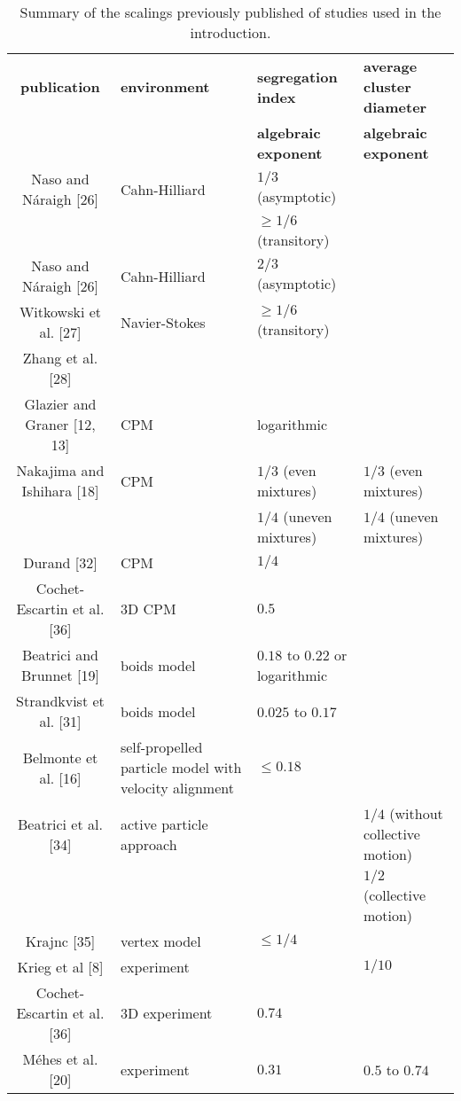 \documentclass[10pt,letterpaper]{article}
\begin{document}
\begin{table}

  \begin{tabular}[h]{c|m{3cm}|m{4cm}|m{5cm}}
  \textbf{publication} & \textbf{environment} & \textbf{segregation index} & \textbf{average cluster diameter} \\
   & & \textbf{algebraic exponent} & \textbf{algebraic exponent} \\
  \hline
    Naso and Náraigh [26] & Cahn-Hilliard & $1/3$ (asymptotic) \\
    & & $\geq 1/6$ (transitory) \\
  \hline
    Naso and Náraigh [26] & Cahn-Hilliard & $2/3$ (asymptotic) \\
    Witkowski et al. [27] & Navier-Stokes & $\geq 1/6$ (transitory) \\
    Zhang et al. [28] &  &  \\
  \hline
    Glazier and Graner [12, 13] & CPM &
    logarithmic & \\
  \hline
    Nakajima and Ishihara [18] & CPM & $1/3$ (even mixtures) & $1/3$ (even mixtures) \\
     & & $1/4$ (uneven mixtures) & $1/4$ (uneven mixtures) \\
 \hline
   Durand [32] & CPM & $1/4$ \\
 \hline
   Cochet-Escartin et al. [36] & 3D CPM & $0.5$\\
 \hline
   Beatrici and Brunnet [19] & boids model & $0.18$ to $0.22$ or logarithmic \\
 \hline
   Strandkvist et al. [31] & boids model & $0.025$ to $0.17$ \\
  \hline
    Belmonte et al. [16] & self-propelled particle model with velocity alignment & $\leq 0.18$\\
  \hline
    Beatrici et al. [34] & active particle approach & & $1/4$ (without collective motion) \\
    & & & $1/2$ (collective motion) \\
  \hline
    Krajnc [35] & vertex model & $\leq 1/4$ \\
  \hline
    Krieg et al [8] & experiment & & $1/10$\\
  \hline
    Cochet-Escartin et al. [36] & 3D experiment & $0.74$ \\
  \hline
    Méhes et al. [20] & experiment & $0.31$ & $0.5$ to $0.74$ \\
  \end{tabular}
  \caption{Summary of the scalings previously published of studies used in the introduction.}
  \label{tab:scaling_summary}
\end{table}
\end{document}
